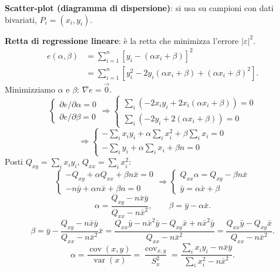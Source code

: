 \documentclass[11pt,a4paper]{article}
\newcommand{\pagina}[1]{\clearpage}
\begin{document}
\textbf{Scatter-plot (diagramma di dispersione)}: si usa su campioni con dati bivariati, $P_i=(x_i,y_i)$.
\begin{center}\end{center}
\textbf{Retta di regressione lineare}: è la retta che minimizza l'errore $|\varepsilon|^2$.
\pagina{9}\begin{align*}e(\alpha,\beta)&=\sum_{i=1}^n[y_i-(\alpha x_i+\beta)]^2\\&=\sum_{i=1}^n[y_i^2-2y_i(\alpha x_i+\beta)+(\alpha x_i+\beta)^2].\end{align*}
Minimizziamo $\alpha$ e $\beta$: $\nabla e=\vec0$.
\[\begin{cases}\partial e/\partial\alpha=0\\\partial e/\partial\beta=0\end{cases}\Rightarrow\begin{cases}\sum_i(-2x_i y_i+2x_i(\alpha x_i+\beta))=0\\\sum_i(-2y_i+2(\alpha x_i+\beta))=0\end{cases}\]
\[\Rightarrow\begin{cases}-\sum_i x_i y_i+\alpha\sum_i x_i^2+\beta\sum_i x_i=0\\-\sum_i y_i+\alpha\sum_i x_i+\beta n=0\end{cases}\]
Posti $Q_{xy}=\sum_i x_i y_i$, $Q_{xx}=\sum_i x_i^2$:
\[\begin{cases}-Q_{xy}+\alpha Q_{xx}+\beta n\bar x=0\\-n\bar y+\alpha n\bar x+\beta n=0\end{cases}\Rightarrow\begin{cases}Q_{xx}\alpha=Q_{xy}-\beta n\bar x\\\bar y=\alpha\bar x+\beta\end{cases}\]
\[\boxed{\alpha=\frac{Q_{xy}-n\bar x\bar y}{Q_{xx}-n\bar x^2},\qquad\beta=\bar y-\alpha\bar x}.\]
\[\beta=\bar y-\frac{Q_{xy}-n\bar x\bar y}{Q_{xx}-n\bar x^2}\bar x=\frac{Q_{xx}\bar y-n\bar x^2\bar y-Q_{xy}\bar x+n\bar x^2\bar y}{Q_{xx}-n\bar x^2}=\frac{Q_{xx}\bar y-Q_{xy}\bar x}{Q_{xx}-n\bar x^2}.\]
\[\boxed{\alpha=\frac{\operatorname{cov}(x,y)}{\operatorname{var}(x)}}=\frac{\operatorname{cov}_{x,y}}{S_x^2}=\frac{\sum_i x_i y_i-n\bar x\bar y}{\sum_i x_i^2-n\bar x^2}.\]
\end{document}
